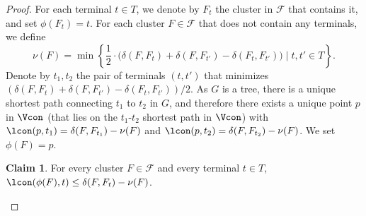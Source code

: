 \documentclass[11pt]{article}
\theoremstyle{definition}
\newtheorem{claim}[theorem]{Claim}
\newcommand{\set}[1]{\left\{ #1 \right\}}
\newcommand{\fset}{{\mathcal{F}}}
\newcounter{note}
\begin{document}
\begin{proof}
For each terminal $t\in T$, we denote by $F_t$ the cluster in $\fset$ that contains it, and set $\phi(F_t)=t$.
For each cluster $F\in \fset$ that does not contain any terminals, we define \[\nu(F)=\min\set{\frac{1}{2}\cdot \big(\delta(F,F_t)+\delta(F,F_{t'})-\delta(F_t,F_{t'})\big)\mid t,t'\in T}.\]
Denote by $t_1,t_2$ the pair of terminals $(t,t')$ that minimizes $(\delta(F,F_t)+\delta(F,F_{t'})-\delta(F_t,F_{t'}))/2$.
As $G$ is a tree, there is a unique shortest path connecting $t_1$ to $t_2$ in $G$, and therefore there exists a unique point $p$ in $\Vcon$ (that lies on the $t_1$-$t_2$ shortest path in $\Vcon$) with $\lcon(p,t_1)=\delta(F,F_{t_1})-\nu(F)$ and $\lcon(p,t_2)=\delta(F,F_{t_2})-\nu(F)$. We set $\phi(F)=p$.
	

 

\begin{claim} \label{clm:t-proj}
For every cluster $F\in \fset$ and every terminal $t\in T$, $\lcon(\phi(F),t) \le \delta(F,F_t) - \nu(F)$. 
\end{claim}


\end{proof}
\end{document}
